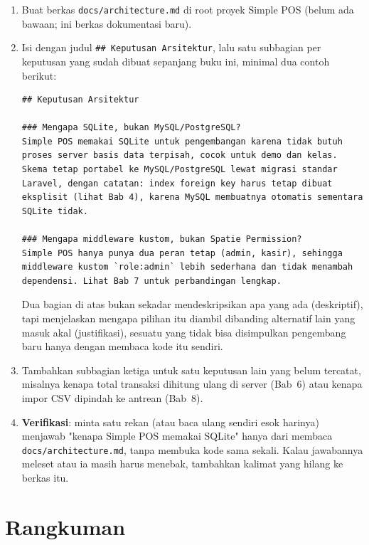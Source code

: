 \begin{enumerate}
  \item Buat berkas \texttt{docs/architecture.md} di root proyek
    Simple POS (belum ada bawaan; ini berkas dokumentasi baru).
  \item Isi dengan judul \texttt{\#\# Keputusan Arsitektur}, lalu satu
    subbagian per keputusan yang sudah dibuat sepanjang buku ini,
    minimal dua contoh berikut:
    \begin{lstlisting}[language={}, title=\lstfile{docs/architecture.md}]
## Keputusan Arsitektur

### Mengapa SQLite, bukan MySQL/PostgreSQL?
Simple POS memakai SQLite untuk pengembangan karena tidak butuh
proses server basis data terpisah, cocok untuk demo dan kelas.
Skema tetap portabel ke MySQL/PostgreSQL lewat migrasi standar
Laravel, dengan catatan: index foreign key harus tetap dibuat
eksplisit (lihat Bab 4), karena MySQL membuatnya otomatis sementara
SQLite tidak.

### Mengapa middleware kustom, bukan Spatie Permission?
Simple POS hanya punya dua peran tetap (admin, kasir), sehingga
middleware kustom `role:admin` lebih sederhana dan tidak menambah
dependensi. Lihat Bab 7 untuk perbandingan lengkap.
    \end{lstlisting}
    Dua bagian di atas bukan sekadar mendeskripsikan apa yang ada
    (deskriptif), tapi menjelaskan mengapa pilihan itu diambil
    dibanding alternatif lain yang masuk akal (justifikasi), sesuatu
    yang tidak bisa disimpulkan pengembang baru hanya dengan membaca
    kode  itu sendiri.
  \item Tambahkan subbagian ketiga untuk satu keputusan lain yang belum
    tercatat, misalnya kenapa total transaksi dihitung ulang di server
    (Bab~6) atau kenapa impor CSV dipindah ke antrean (Bab~8).
  \item \textbf{Verifikasi}: minta satu rekan (atau baca ulang sendiri
    esok harinya) menjawab "kenapa Simple POS memakai SQLite" hanya
    dari membaca \texttt{docs/architecture.md}, tanpa membuka kode sama
    sekali. Kalau jawabannya meleset atau ia masih harus menebak,
    tambahkan kalimat yang hilang ke berkas itu.
\end{enumerate}


\section{Rangkuman}
\label{sec:optimasi-dan-deployment-rangkuman}

